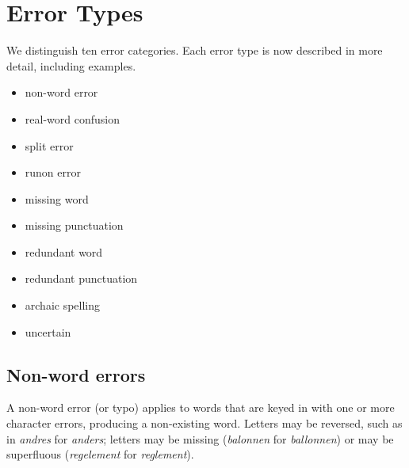 \documentclass[a4paper,11pt]{article}
\begin{document}

\section{Error Types}

We distinguish ten error categories. Each error type is now described in more detail, including examples.

\begin{itemize}
  \item non-word error
  \item real-word confusion
  \item split error
  \item runon error
  \item missing word
  \item missing punctuation
  \item redundant word
  \item redundant punctuation
  \item archaic spelling
  \item uncertain
\end{itemize}


\subsection{Non-word errors}

A non-word error (or typo) applies to words that are keyed in with one
or more character errors, producing a non-existing word. Letters may
be reversed, such as in \emph{andres} for \emph{anders}; letters may
be missing (\emph{balonnen} for \emph{ballonnen}) or may be
superfluous (\emph{regelement} for \emph{reglement}). 
\end{document}
